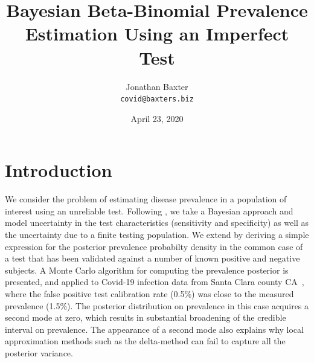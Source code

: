 \documentclass[dvipdfmx]{article}
\begin{document}
\title{Bayesian Beta-Binomial Prevalence Estimation Using an Imperfect
  Test} \author{Jonathan Baxter\\\tt{covid@baxters.biz}} \date{April 23, 2020}\maketitle
{}

\section{Introduction}
We consider the problem of estimating disease prevalence in a
population of interest using an unreliable test. Following
\cite{diggle_2011,greenland_1996}, we take a Bayesian approach and
model uncertainty in the test characteristics (sensitivity and
specificity) as well as the uncertainty due to a finite testing
population. We extend \cite{diggle_2011} by deriving a simple
expression for the posterior prevalence probabilty density in the
common case of a test that has been validated against a number of
known positive and negative subjects. A Monte Carlo algorithm for
computing the prevalence posterior is presented, and applied to
Covid-19 infection data from Santa Clara county
CA~\cite{Bendavid2020.04.14.20062463}, where the false positive test
calibration rate (0.5\%) was close to the measured prevalence
(1.5\%). The posterior distribution on prevalence in this case
acquires a second mode at zero, which results in substantial
broadening of the credible interval on prevalence. The appearance of a
second mode also explains why local approximation methods such as the
delta-method can fail to capture all the posterior variance.
\end{document}

